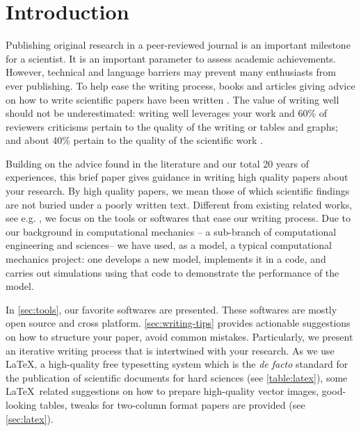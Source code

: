 \documentclass[authoryear,3p,times,preprint,review,fleqn]{elsarticle}
\numberwithin{equation}{section}
\theoremstyle{remark}
\begin{document}
\tableofcontents

\section{Introduction}

\showthe\textwidth %

Publishing original research in a peer-reviewed  journal is an important milestone for a scientist. It is an important parameter to assess academic achievements. 
However, technical and language barriers may prevent many enthusiasts from ever publishing. To help ease the writing process, books and articles giving advice on how to write scientific papers have been written \citep{day1998write,ashby2000write,plaxco2010art}. The value of writing well should not be underestimated: writing well leverages your work and 60\% of reviewers criticisms pertain to the quality of the writing or tables and graphs; and about 40\% pertain to the quality of the scientific work \citep{iles1997guidebook}.

Building on the advice found in the literature and our total 20 years of experiences, this brief paper gives guidance in writing high quality papers about your research. By high quality papers, we mean those of which scientific findings are not buried under a poorly written text.
Different from existing related works, see e.g. \cite{day1998write,ashby2000write}, we focus on the tools or softwares that ease our writing process. Due to our background in computational mechanics -- a sub-branch of computational engineering and sciences-- we have used, as a model, a typical computational mechanics project: one develops a new model, implements it in a code, and carries out simulations using that code to demonstrate the performance of the model. 

In \cref{sec:tools}, our favorite softwares are presented. These softwares are mostly open source and cross platform. \cref{sec:writing-tips} provides actionable suggestions on how to structure your paper, avoid common mistakes.  Particularly, we present an iterative writing process that is intertwined with your research.
As we use \LaTeX, a high-quality free typesetting system which is the \textit{de facto} standard for the publication of scientific documents for hard sciences (see \cref{table:latex}), some \LaTeX\ related suggestions on how to prepare high-quality vector images, good-looking tables, tweaks for two-column format papers are provided (see \cref{sec:latex}). 
\end{document}
